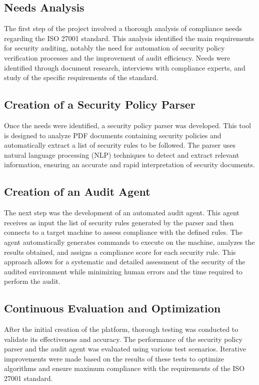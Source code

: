 \subsection{Needs Analysis}
The first step of the project involved a thorough analysis of compliance needs regarding the ISO 27001 standard. This analysis identified the main requirements for security auditing, notably the need for automation of security policy verification processes and the improvement of audit efficiency. Needs were identified through document research, interviews with compliance experts, and study of the specific requirements of the standard.

\subsection{Creation of a Security Policy Parser}
Once the needs were identified, a security policy parser was developed. This tool is designed to analyze PDF documents containing security policies and automatically extract a list of security rules to be followed. The parser uses natural language processing (NLP) techniques to detect and extract relevant information, ensuring an accurate and rapid interpretation of security documents.

\subsection{Creation of an Audit Agent}
The next step was the development of an automated audit agent. This agent receives as input the list of security rules generated by the parser and then connects to a target machine to assess compliance with the defined rules. The agent automatically generates commands to execute on the machine, analyzes the results obtained, and assigns a compliance score for each security rule. This approach allows for a systematic and detailed assessment of the security of the audited environment while minimizing human errors and the time required to perform the audit.

\subsection{Continuous Evaluation and Optimization}
After the initial creation of the platform, thorough testing was conducted to validate its effectiveness and accuracy. The performance of the security policy parser and the audit agent was evaluated using various test scenarios. Iterative improvements were made based on the results of these tests to optimize algorithms and ensure maximum compliance with the requirements of the ISO 27001 standard.

